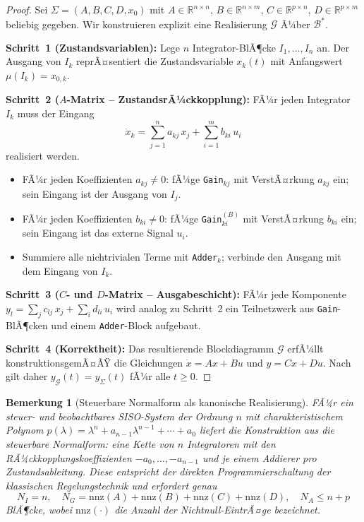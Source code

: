 ﻿\documentclass[12pt,a4paper]{article}
\newtheorem{bemerkung}[theorem]{Bemerkung}
\theoremstyle{definition}
\begin{document}
\begin{proof}
Sei $\Sigma = (A, B, C, D, x_0)$ mit $A \in \mathbb{R}^{n \times n}$,
$B \in \mathbb{R}^{n \times m}$, $C \in \mathbb{R}^{p \times n}$,
$D \in \mathbb{R}^{p \times m}$ beliebig gegeben. Wir konstruieren
explizit eine Realisierung $\mathcal{G}$ Ã¼ber $\mathcal{B}^*$.

\textbf{Schritt~1 (Zustandsvariablen):} Lege $n$ Integrator-BlÃ¶cke
$I_1, \ldots, I_n$ an. Der Ausgang von $I_k$ reprÃ¤sentiert die
Zustandsvariable $x_k(t)$ mit Anfangswert $\mu(I_k) = x_{0,k}$.

\textbf{Schritt~2 ($A$-Matrix -- ZustandsrÃ¼ckkopplung):} FÃ¼r jeden
Integrator $I_k$ muss der Eingang
\[
  \dot{x}_k = \sum_{j=1}^n a_{kj}\,x_j + \sum_{i=1}^m b_{ki}\,u_i
\]
realisiert werden.
\begin{itemize}[nosep]
  \item FÃ¼r jeden Koeffizienten $a_{kj} \neq 0$: fÃ¼ge
        \texttt{Gain}$_{kj}$ mit VerstÃ¤rkung $a_{kj}$ ein; sein Eingang
        ist der Ausgang von $I_j$.
  \item FÃ¼r jeden Koeffizienten $b_{ki} \neq 0$: fÃ¼ge
        \texttt{Gain}$_{ki}^{(B)}$ mit VerstÃ¤rkung $b_{ki}$ ein; sein
        Eingang ist das externe Signal $u_i$.
  \item Summiere alle nichtrivialen Terme mit \texttt{Adder}$_k$; verbinde
        den Ausgang mit dem Eingang von $I_k$.
\end{itemize}

\textbf{Schritt~3 ($C$- und $D$-Matrix -- Ausgabeschicht):} FÃ¼r jede
Komponente $y_l = \sum_j c_{lj}\,x_j + \sum_i d_{li}\,u_i$ wird analog
zu Schritt~2 ein Teilnetzwerk aus \texttt{Gain}-BlÃ¶cken und einem
\texttt{Adder}-Block aufgebaut.

\textbf{Schritt~4 (Korrektheit):} Das resultierende Blockdiagramm
$\mathcal{G}$ erfÃ¼llt konstruktionsgemÃ¤ÃŸ die Gleichungen
$\dot{x} = Ax + Bu$ und $y = Cx + Du$. Nach  gilt daher
$y_{\mathcal{G}}(t) = y_{\Sigma}(t)$ fÃ¼r alle $t \geq 0$.
\end{proof}

\begin{bemerkung}[Steuerbare Normalform als kanonische Realisierung]
\label{bem:steuerbar}
FÃ¼r ein steuer- und beobachtbares SISO-System der Ordnung $n$ mit
charakteristischem Polynom
$p(\lambda) = \lambda^n + a_{n-1}\lambda^{n-1} + \cdots + a_0$
liefert die Konstruktion aus  die
\emph{steuerbare Normalform}: eine Kette von $n$ Integratoren mit den
RÃ¼ckkopplungskoeffizienten $-a_0, \ldots, -a_{n-1}$ und je einem
Addierer pro Zustandsableitung. Diese entspricht der direkten
Programmierschaltung der klassischen Regelungstechnik und erfordert genau
\[
  N_I = n,\quad
  N_G = \mathrm{nnz}(A) + \mathrm{nnz}(B) + \mathrm{nnz}(C) + \mathrm{nnz}(D),\quad
  N_A \leq n + p
\]
BlÃ¶cke, wobei $\mathrm{nnz}(\cdot)$ die Anzahl der Nichtnull-EintrÃ¤ge bezeichnet.
\end{bemerkung}
\end{document}
